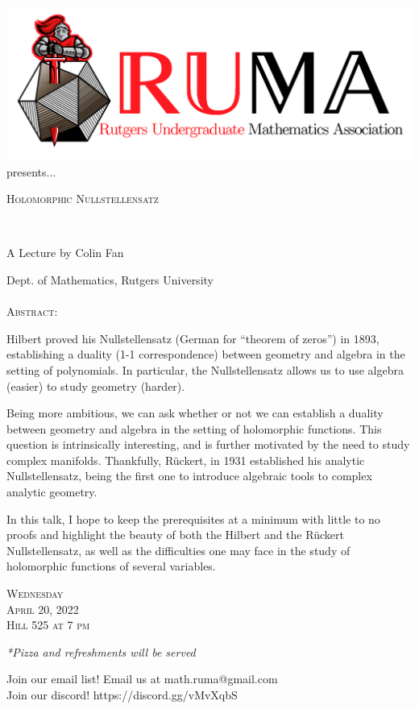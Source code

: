 \documentclass[12pt]{article}
\begin{document}

\begin{center}\includegraphics[scale=.45]{RUMAlogo.png}\\
presents... \\
\begin{spacing}{1}
{\fontsize{33}{33}\selectfont  \textsc{Holomorphic Nullstellensatz}} \end{spacing}

 

~~\\
\begin{spacing}{1.5}
{\fontsize{23}{23} \selectfont A Lecture by Colin Fan}  \end{spacing} 
\large Dept. of Mathematics, Rutgers University \\~~\\

\normalsize
\textsc{Abstract:}

\large
Hilbert proved his Nullstellensatz (German for ``theorem of zeros'') in 1893, establishing a duality (1-1 correspondence) between geometry and algebra in the setting of polynomials. In particular, the Nullstellensatz allows us to use algebra (easier) to study geometry (harder). 

Being more ambitious, we can ask whether or not we can establish a duality between geometry and algebra in the setting of holomorphic functions. This question is intrinsically interesting, and is further motivated by the need to study complex manifolds. Thankfully, Rückert, in 1931 established his analytic Nullstellensatz, being the first one to introduce algebraic tools to complex analytic geometry. 

In this talk, I hope to keep the prerequisites at a minimum with little to no proofs and highlight the beauty of both the Hilbert and the Rückert Nullstellensatz, as well as the difficulties one may face in the study of holomorphic functions of several variables. 

\vspace{2mm} 
\huge   \textsc{Wednesday\\April 20, 2022 \\Hill 525 at 7
  pm}

\vspace{2mm}
\large
\emph{*Pizza and refreshments will be served}

  \Large  Join our email list! Email us at
  math.ruma@gmail.com\\Join our discord!
  https://discord.gg/vMvXqbS
\end{center}
\end{document}
